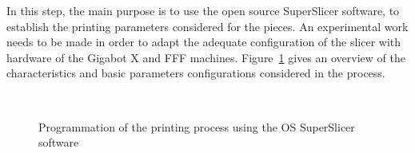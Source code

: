 \documentclass[
  11pt,
]{article}
\begin{document}
In this step, the main purpose is to use the open source SuperSlicer
software, to establish the printing parameters considered for the
pieces. An experimental work needs to be made in order to adapt the
adequate configuration of the slicer with hardware of the Gigabot X and
FFF machines. Figure~\ref{fig-gcode} gives an overview of the
characteristics and basic parameters configurations considered in the
process.

\begin{figure}

\begin{minipage}[t]{0.40\linewidth}

{\centering 


\caption{\label{fig-gcode}Programmation of the printing process using
the OS SuperSlicer software}

}

\end{minipage}%
%
\begin{minipage}[t]{0.05\linewidth}

{\centering 

~

}

\end{minipage}%
%
\begin{minipage}[t]{0.55\linewidth}


\end{minipage}
\end{figure}
\end{document}

